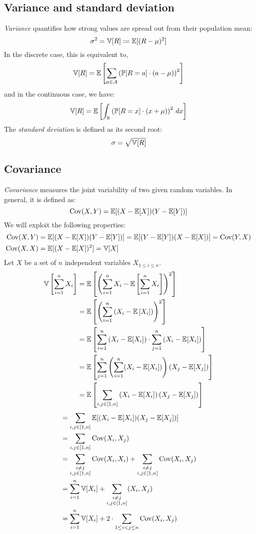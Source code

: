 \subsection{Variance and standard deviation}
\label{sec:bp-var-sd}
%
\emph{Variance} quantifies how strong values are spread out from their population mean:
\[ \sigma^2 = \mathbb V[R] \coloneqq \mathbb E[(R - \mu)^2] \]
In the discrete case, this is equivalent to,
\[ \mathbb V[R] = \mathbb E\left[\sum_{a \in \mathcal A} \left(\mathbb P[R=a] \cdot (a - \mu)\right)^2\right] \]
and in the continuous case, we have:
\[ \mathbb V[R] = \mathbb E\left[\int_{\mathbb R} \left(\mathbb P[R=x] \cdot (x + \mu)\right)^2 \, dx\right] \]
The \emph{standard deviation} is defined as its second root:
\[ \sigma = \sqrt{\mathbb V[R]} \]

\subsection{Covariance}
\label{sec:covar}
%
\emph{Covariance} measures the joint variability of two given random variables.
%
In general, it is defined as:
\[ \operatorname{Cov}(X,Y) = \mathbb E[(X - \mathbb E[X])(Y - \mathbb E[Y])] \]
%
We will exploit the following properties:
\begin{align}
  \operatorname{Cov}(X,Y) &= \mathbb E[(X - \mathbb E[X])(Y - \mathbb E[Y])] = \mathbb E[(Y - \mathbb E[Y])(X - \mathbb E[X])] = \operatorname{Cov}(Y,X) \\
  \operatorname{Cov}(X,X) &= \mathbb E[(X - \mathbb E[X])^2] = \mathbb V[X]
\end{align}
%
Let $X$ be a set of $n$ independent variables $X_{1 \leq i \leq n}$.
\begin{align}
  \mathbb V\left[\sum_{i=1}^n X_i\right]
    &= \mathbb E\left[\left(\sum_{i=1}^n X_i - \mathbb E\left[\sum_{i=1}^n X_i\right]\right)^2\right] \nonumber \\
    &= \mathbb E\left[\left(\sum_{i=1}^n \left(X_i - \mathbb E\left[X_i\right]\right)\right)^2\right] \nonumber \\
    &= \mathbb E\left[\sum_{i=1}^n \left(X_i - \mathbb E[X_i]\right) \cdot \sum_{j=1}^n \left(X_i - \mathbb E[X_i]\right)\right] \nonumber \\
    &= \mathbb E\left[\sum_{j=1}^n \left(\sum_{i=1}^n (X_i - \mathbb E[X_i])\right) (X_j - \mathbb E[X_j]) \right] \nonumber \\
    &= \mathbb E\left[\sum_{i,j \in [1,n]} \left(X_i - \mathbb E[X_i]\right) \left(X_j - \mathbb E[X_j]\right)\right] \nonumber
\end{align}
\begin{align}
    &= \sum_{i,j \in [1,n]} \mathbb E[(X_i - \mathbb E[X_i])(X_j - \mathbb E[X_j])] \nonumber \\
    &= \sum_{i,j \in [1,n]} \operatorname{Cov}(X_i, X_j) \nonumber \\
    &= \sum_{\substack{i \neq j \\ i,j \in [1,n]}} \operatorname{Cov}(X_i, X_i) + \sum_{\substack{i \neq j \\ i,j \in [1,n]}} \operatorname{Cov}(X_i, X_j) \nonumber \\
    &= \sum_{i=1}^n \mathbb V[X_i] + \sum_{\substack{i \neq j \\ i,j \in [1,n]}} (X_i, X_j) \nonumber \\
    &= \sum_{i=1}^n \mathbb V[X_i] + 2 \cdot \sum_{1 \leq i < j \leq n} \operatorname{Cov}(X_i, X_j) \label{eq:sumVarCov}
\end{align}


